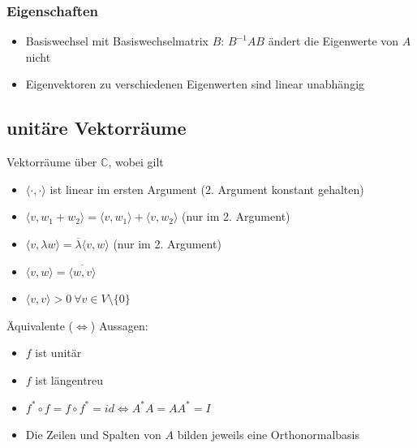 \documentclass[german, fourcolumn, 8pt]{latex4ei/latex4ei_sheet}
\newcommand{\equival}[0]{\ensuremath{\Longleftrightarrow}}
\begin{document}
\begin{sectionbox}
    \subsubsection{Eigenschaften}
    \begin{itemize}
        \item Basiswechsel mit Basiswechselmatrix $B$: $B^{-1}AB$ ändert die Eigenwerte von $A$ nicht
        \item Eigenvektoren zu verschiedenen Eigenwerten sind linear unabhängig
    \end{itemize}
\end{sectionbox}

\subsection{unitäre Vektorräume}
Vektorräume über $\mathbb C$, wobei gilt
\begin{itemize}
    \item $\langle \cdot, \cdot \rangle$ ist linear im ersten Argument (2. Argument konstant gehalten)
    \item $\langle v,w_1+w_2\rangle = \langle v,w_1\rangle + \langle v,w_2 \rangle$ (nur im 2. Argument)
    \item $\langle v, \lambda w\rangle = \overline \lambda \langle v,w \rangle$ (nur im 2. Argument)
    \item $\langle v,w \rangle = \overline{\langle w,v \rangle}$
    \item $\langle v,v \rangle > 0 \ \forall v \in V\setminus \{0\}$
\end{itemize}
\begin{sectionbox}
    Äquivalente (\equival) Aussagen:
    \begin{itemize}
        \item $f$ ist unitär
        \item $f$ ist längentreu
        \item $f^* \circ f=f \circ f^*=id \equival A^*A=AA^*=I$
        \item Die Zeilen und Spalten von $A$ bilden jeweils eine Orthonormalbasis
    \end{itemize}
\end{sectionbox}
\end{document}
